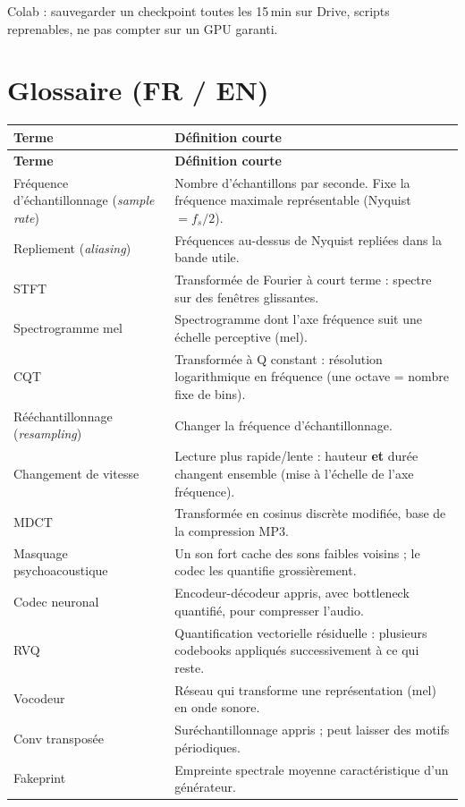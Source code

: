 \documentclass[11pt,a4paper]{article}
\begin{document}
Colab : sauvegarder un checkpoint toutes les 15\,min sur Drive, scripts reprenables, ne pas compter sur un GPU garanti.
\section{Glossaire (FR / EN)}\label{sec:gloss}

{\small
\begin{longtable}{L{4.2cm}L{11.1cm}}
\toprule
\textbf{Terme} & \textbf{Définition courte}\\
\midrule
\endfirsthead
\toprule
\textbf{Terme} & \textbf{Définition courte}\\
\midrule
\endhead
\bottomrule
\endfoot
Fréquence d'échantillonnage (\emph{sample rate}) & Nombre d'échantillons par seconde. Fixe la fréquence maximale représentable (Nyquist $=f_s/2$).\\
Repliement (\emph{aliasing}) & Fréquences au-dessus de Nyquist repliées dans la bande utile.\\
STFT & Transformée de Fourier à court terme : spectre sur des fenêtres glissantes.\\
Spectrogramme mel & Spectrogramme dont l'axe fréquence suit une échelle perceptive (mel).\\
CQT & Transformée à Q constant : résolution logarithmique en fréquence (une octave = nombre fixe de bins).\\
Rééchantillonnage (\emph{resampling}) & Changer la fréquence d'échantillonnage.\\
Changement de vitesse & Lecture plus rapide/lente : hauteur \textbf{et} durée changent ensemble (mise à l'échelle de l'axe fréquence).\\
MDCT & Transformée en cosinus discrète modifiée, base de la compression MP3.\\
Masquage psychoacoustique & Un son fort cache des sons faibles voisins ; le codec les quantifie grossièrement.\\
Codec neuronal & Encodeur-décodeur appris, avec bottleneck quantifié, pour compresser l'audio.\\
RVQ & Quantification vectorielle résiduelle : plusieurs codebooks appliqués successivement à ce qui reste.\\
Vocodeur & Réseau qui transforme une représentation (mel) en onde sonore.\\
Conv transposée & Suréchantillonnage appris ; peut laisser des motifs périodiques.\\
Fakeprint & Empreinte spectrale moyenne caractéristique d'un générateur.\\

\end{longtable}}
\end{document}
